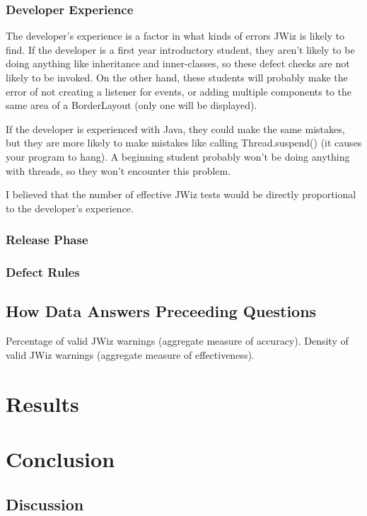 \subsection{Developer Experience}
The developer's experience is a factor in what kinds of errors JWiz is
likely to find.  If the developer is a first year introductory student,
they aren't likely to be doing anything like inheritance and inner-classes,
so these defect checks are not likely to be invoked.  On the other hand,
these students will probably make the error of not creating a listener for
events, or adding multiple components to the same area of a BorderLayout
(only one will be displayed).

If the developer is experienced with Java, they could make the same
mistakes, but they are more likely to make mistakes like calling
Thread.suspend() (it causes your program to hang).  A beginning student
probably won't be doing anything with threads, so they won't encounter this
problem.

I believed that the number of effective JWiz tests would be directly
proportional to the developer's experience.

 
\subsection{Release Phase}
\subsection{Defect Rules}

\section{How Data Answers Preceeding Questions}
Percentage of valid JWiz warnings (aggregate measure of accuracy).  Density
of valid JWiz warnings (aggregate measure of effectiveness).




\chapter{Results}





\chapter{Conclusion}
\section{Discussion}
